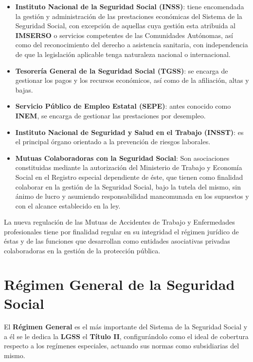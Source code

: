 \begin{itemize}
    \item \textbf{Instituto Nacional de la Seguridad Social (INSS)}: tiene encomendada la gestión y administración de las prestaciones económicas del Sistema de la Seguridad Social, con excepción de aquellas cuya gestión esta atribuida al \textbf{IMSERSO} o servicios competentes de las Comunidades Autónomas, así como del reconocimiento del derecho a asistencia sanitaria, con independencia de que la legislación aplicable tenga naturaleza nacional o internacional.

    \item \textbf{Tesorería General de la Seguridad Social (TGSS)}: se encarga de gestionar los pagos y los recursos económicos, así como de la afiliación, altas y bajas.

    \item \textbf{Servicio Público de Empleo Estatal (SEPE)}: antes conocido como \textbf{INEM}, se encarga de gestionar las prestaciones por desempleo.

    \item \textbf{Instituto Nacional de Seguridad y Salud en el Trabajo (INSST)}: es el principal órgano orientado a la prevención de riesgos laborales.

    \item \textbf{Mutuas Colaboradoras con la Seguridad Social}: Son asociaciones constituidas mediante la autorización del Ministerio de Trabajo y Economía Social en el Registro especial dependiente de éste, que tienen como finalidad colaborar en la gestión de la Seguridad Social, bajo la tutela del mismo, sin ánimo de lucro y asumiendo responsabilidad mancomunada en los supuestos y con el alcance establecido en la ley.
\end{itemize}

La nueva regulación de las Mutuas de Accidentes de Trabajo y Enfermedades profesionales tiene por finalidad regular en su integridad el régimen jurídico de éstas y de las funciones que desarrollan como entidades asociativas privadas colaboradoras en la gestión de la protección pública.

\section{Régimen General de la Seguridad Social}
El \textbf{Régimen General} es el más importante del Sistema de la Seguridad Social y a él se le dedica la \textbf{LGSS} el \textbf{Título II}, configurándolo como el ideal de cobertura respecto a los regímenes especiales, actuando sus normas como subsidiarias del mismo.


